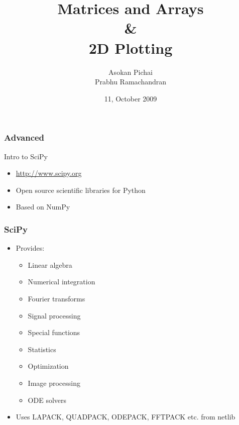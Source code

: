\documentclass[14pt,compress]{beamer}
\title[]{Matrices and Arrays\\ \& \\2D Plotting}
\author[FOSSEE Team] {Asokan Pichai\\Prabhu Ramachandran}
\institute[FOSSEE] {FOSSEE Team}
\date[] {11, October 2009}
\newcounter{time}
\newcommand{\inctime}[1]{\addtocounter{time}{#1}{\tiny \thetime\ m}}
\newcommand{\typ}[1]{\lstlisting{#1}}
\begin{document}
\begin{frame}[fragile]
  \frametitle{Advanced}
\end{frame}

\begin{frame}
    {Intro to SciPy}
  \begin{itemize}
  \item \url{http://www.scipy.org}
  \item Open source scientific libraries for Python
  \item Based on NumPy
    \end{itemize}

    \inctime{25}
\end{frame}

\begin{frame}
  \frametitle{SciPy}
  \begin{itemize}
  \item Provides:
    \begin{itemize}
    \item Linear algebra
    \item Numerical integration
    \item Fourier transforms
    \item Signal processing
    \item Special functions
    \item Statistics
    \item Optimization
    \item Image processing
    \item ODE solvers
    \end{itemize}
  \item Uses LAPACK, QUADPACK, ODEPACK, FFTPACK etc. from netlib
  \end{itemize}
\end{frame}
\end{document}
